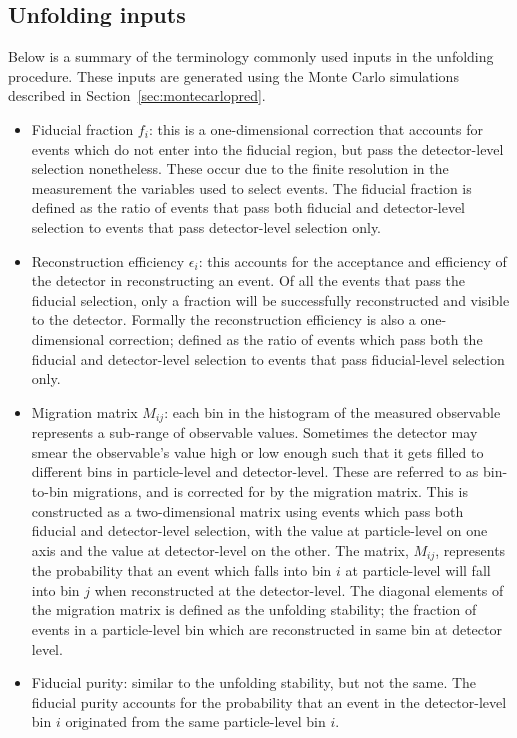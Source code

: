 \subsection{Unfolding inputs}
Below is a summary of the terminology commonly used inputs in the unfolding procedure. These inputs are generated using the Monte Carlo simulations described in Section~\ref{sec:montecarlopred}. 

\begin{itemize}
    \item Fiducial fraction $f_i$: this is a one-dimensional correction that accounts for events which do not enter into the fiducial region, but pass the detector-level selection nonetheless. These occur due to the finite resolution in the measurement the variables used to select events. The fiducial fraction is defined as the ratio of events that pass both fiducial and detector-level selection to events that pass detector-level selection only.
    \item Reconstruction efficiency $\epsilon_i$: this accounts for the acceptance and efficiency of the detector in reconstructing an event. Of all the events that pass the fiducial selection, only a fraction will be successfully reconstructed and visible to the detector. Formally the reconstruction efficiency is also a one-dimensional correction; defined as the ratio of events which pass both the fiducial and detector-level selection to events that pass fiducial-level selection only.
    \item Migration matrix $M_{ij}$: each bin in the histogram of the measured observable represents a sub-range of observable values. Sometimes the detector may smear the observable's value high or low enough such that it gets filled to different bins in particle-level and detector-level. These are referred to as bin-to-bin migrations, and is corrected for by the migration matrix. This is constructed as a two-dimensional matrix using events which pass both fiducial and detector-level selection, with the value at particle-level on one axis and the value at detector-level on the other. The matrix, $M_{ij}$, represents the probability that an event which falls into bin $i$ at particle-level will fall into bin $j$ when reconstructed at the detector-level. The diagonal elements of the migration matrix is defined as the unfolding stability; the fraction of events in a particle-level bin which are reconstructed in same bin at detector level.
    \item Fiducial purity: similar to the unfolding stability, but not the same. The fiducial purity accounts for the probability that an event in the detector-level bin $i$ originated from the same particle-level bin $i$. 
\end{itemize}

